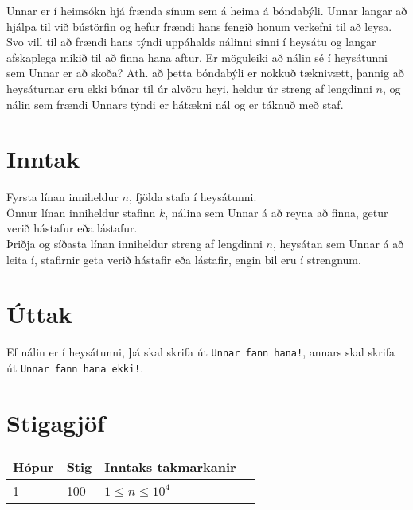 Unnar er í heimsókn hjá frænda sínum sem á heima á bóndabýli. Unnar langar að hjálpa til við bústörfin og hefur frændi hans fengið honum verkefni til að leysa.
Svo vill til að frændi hans týndi uppáhalds nálinni sinni í heysátu og langar afskaplega mikið til að finna hana aftur. Er möguleiki að nálin sé í heysátunni sem Unnar
er að skoða? Ath. að þetta bóndabýli er nokkuð tæknivætt, þannig að heysáturnar eru ekki búnar til úr alvöru heyi, heldur úr streng af lengdinni $n$, og nálin sem frændi Unnars
týndi er hátækni nál og er táknuð með staf.

\section*{Inntak}
Fyrsta línan inniheldur $n$, fjölda stafa í heysátunni.\\
Önnur línan inniheldur stafinn $k$, nálina sem Unnar á að reyna að finna, getur verið hástafur eða lástafur.\\
Þriðja og síðasta línan inniheldur streng af lengdinni $n$, heysátan sem Unnar á að leita í, stafirnir geta verið hástafir eða lástafir, engin bil eru í strengnum.\\
\section*{Úttak}
Ef nálin er í heysátunni, þá skal skrifa út \texttt{Unnar fann hana!}, annars skal skrifa út \texttt{Unnar fann hana ekki!}.

\section*{Stigagjöf}
\begin{tabular}{|l|l|l|l|}
\hline
Hópur & Stig & Inntaks takmarkanir \\ \hline
1     & 100     & $1 \leq n \leq 10^4$ \\ \hline
\end{tabular}
